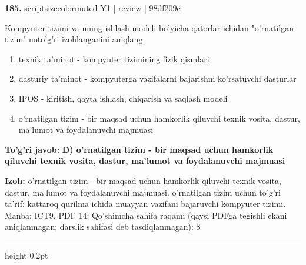 \documentclass[10pt,a4paper]{article}
\begin{document}
{\bfseries\sffamily\color{ink} 185.} {scriptsizecolor{muted} Y1 | review | 98df209e}
\par
Kompyuter tizimi va uning ishlash modeli bo'yicha qatorlar ichidan "o'rnatilgan tizim" noto'g'ri izohlanganini aniqlang.
\begin{enumerate}[label=\Alph*),leftmargin=9mm]
\item texnik ta'minot - kompyuter tizimining fizik qismlari
\item dasturiy ta'minot - kompyuterga vazifalarni bajarishni ko'rsatuvchi dasturlar
\item IPOS - kiritish, qayta ishlash, chiqarish va saqlash modeli
\item o'rnatilgan tizim - bir maqsad uchun hamkorlik qiluvchi texnik vosita, dastur, ma'lumot va foydalanuvchi majmuasi
\end{enumerate}
\begin{tcolorbox}[enhanced,breakable,colback=teal!4,colframe=teal!60!black,boxrule=0.45pt,arc=1.2mm,left=2.7mm,right=2.7mm,top=1.8mm,bottom=1.8mm,before skip=2mm,after skip=2mm]
{\bfseries\sffamily\color{teal}To'g'ri javob:} \textbf{D) o'rnatilgan tizim - bir maqsad uchun hamkorlik qiluvchi texnik vosita, dastur, ma'lumot va foydalanuvchi majmuasi}
\par\smallskip
{\bfseries Izoh:} o'rnatilgan tizim - bir maqsad uchun hamkorlik qiluvchi texnik vosita, dastur, ma'lumot va foydalanuvchi majmuasi. o'rnatilgan tizim uchun to'g'ri ta'rif: kattaroq qurilma ichida muayyan vazifani bajaruvchi kompyuter tizimi. Manba: ICT9, PDF 14; Qo'shimcha sahifa raqami (qaysi PDFga tegishli ekani aniqlanmagan; darslik sahifasi deb tasdiqlanmagan): 8
\end{tcolorbox}
\vspace{2mm}\hrule height 0.2pt\vspace{3mm}
\end{document}

